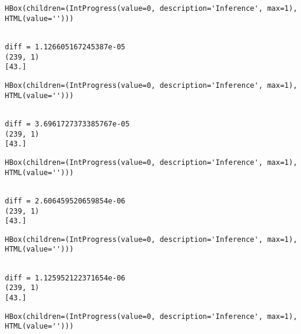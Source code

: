 \documentclass[11pt]{article}
\begin{document}
    
    \begin{verbatim}
HBox(children=(IntProgress(value=0, description='Inference', max=1), HTML(value='')))
    \end{verbatim}

    
    \begin{Verbatim}[commandchars=\\\{\}]

diff = 1.126605167245387e-05
(239, 1)
[43.]

    \end{Verbatim}

    
    \begin{verbatim}
HBox(children=(IntProgress(value=0, description='Inference', max=1), HTML(value='')))
    \end{verbatim}

    
    \begin{Verbatim}[commandchars=\\\{\}]

diff = 3.6961727373385767e-05
(239, 1)
[43.]

    \end{Verbatim}

    
    \begin{verbatim}
HBox(children=(IntProgress(value=0, description='Inference', max=1), HTML(value='')))
    \end{verbatim}

    
    \begin{Verbatim}[commandchars=\\\{\}]

diff = 2.606459520659854e-06
(239, 1)
[43.]

    \end{Verbatim}

    
    \begin{verbatim}
HBox(children=(IntProgress(value=0, description='Inference', max=1), HTML(value='')))
    \end{verbatim}

    
    \begin{Verbatim}[commandchars=\\\{\}]

diff = 1.125952122371654e-06
(239, 1)
[43.]

    \end{Verbatim}

    
    \begin{verbatim}
HBox(children=(IntProgress(value=0, description='Inference', max=1), HTML(value='')))
    \end{verbatim}
\end{document}
